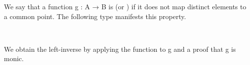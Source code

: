 
We say that a function \ab g \as : \ab A \as → \ab B is  (or ) if it does not map distinct elements to a common point. The following type manifests this property.
\ccpad
\begin{code}%
\>[1]\AgdaSpace{}%
\AgdaSymbol{:}\AgdaSpace{}%
\AgdaSymbol{(}\AgdaSpace{}%
\AgdaSymbol{:}\AgdaSpace{}%
\AgdaSpace{}%
\AgdaSpace{}%
\AgdaSymbol{)}\AgdaSpace{}%
\AgdaSpace{}%
\AgdaSpace{}%
\AgdaSpace{}%
\AgdaSpace{}%
\<%
\\
%
\>[1]\AgdaSpace{}%
\AgdaSpace{}%
\AgdaSymbol{=}\AgdaSpace{}%
\AgdaSpace{}%
\AgdaSpace{}%
\AgdaSpace{}%
\AgdaSpace{}%
\AgdaSpace{}%
\AgdaSpace{}%
\AgdaSpace{}%
\AgdaSpace{}%
\AgdaSpace{}%
\AgdaSpace{}%
\AgdaSpace{}%
\AgdaSpace{}%
\<%
\end{code}
\ccpad
We obtain the left-inverse by applying the function  to \ab g and a proof that \ab g is monic.
\ccpad
